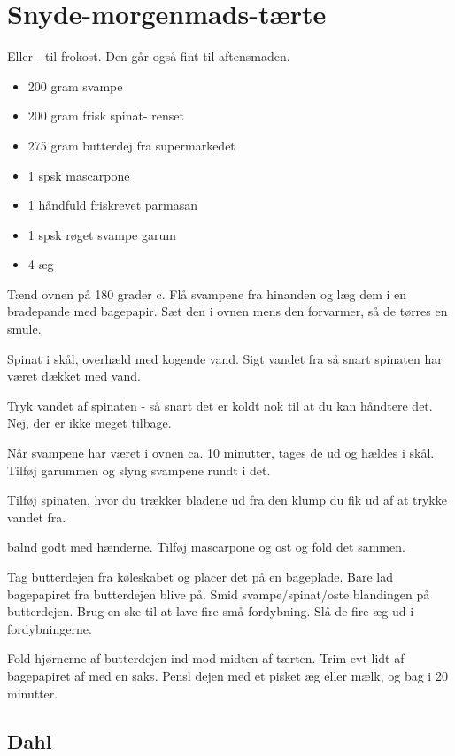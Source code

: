 \documentclass[
  letterpaper,
  DIV=11,
  numbers=noendperiod]{scrreprt}
\providecommand{\tightlist}{%
  \setlength{\itemsep}{0pt}\setlength{\parskip}{0pt}}\usepackage{longtable,booktabs,array}
\begin{document}

\hypertarget{snyde-morgenmads-tuxe6rte}{%
\chapter{Snyde-morgenmads-tærte}\label{snyde-morgenmads-tuxe6rte}}

Eller - til frokost. Den går også fint til aftensmaden.

\begin{itemize}
\tightlist
\item
  200 gram svampe
\item
  200 gram frisk spinat- renset
\item
  275 gram butterdej fra supermarkedet
\item
  1 spsk mascarpone
\item
  1 håndfuld friskrevet parmasan
\item
  1 spsk røget svampe garum
\item
  4 æg
\end{itemize}

Tænd ovnen på 180 grader c. Flå svampene fra hinanden og læg dem i en
bradepande med bagepapir. Sæt den i ovnen mens den forvarmer, så de
tørres en smule.

Spinat i skål, overhæld med kogende vand. Sigt vandet fra så snart
spinaten har været dækket med vand.

Tryk vandet af spinaten - så snart det er koldt nok til at du kan
håndtere det. Nej, der er ikke meget tilbage.

Når svampene har været i ovnen ca. 10 minutter, tages de ud og hældes i
skål. Tilføj garummen og slyng svampene rundt i det.

Tilføj spinaten, hvor du trækker bladene ud fra den klump du fik ud af
at trykke vandet fra.

balnd godt med hænderne. Tilføj mascarpone og ost og fold det sammen.

Tag butterdejen fra køleskabet og placer det på en bageplade. Bare lad
bagepapiret fra butterdejen blive på. Smid svampe/spinat/oste blandingen
på butterdejen. Brug en ske til at lave fire små fordybning. Slå de fire
æg ud i fordybningerne.

Fold hjørnerne af butterdejen ind mod midten af tærten. Trim evt lidt af
bagepapiret af med en saks. Pensl dejen med et pisket æg eller mælk, og
bag i 20 minutter.

\hypertarget{dahl-1}{%
\section{Dahl}\label{dahl-1}}
\end{document}
